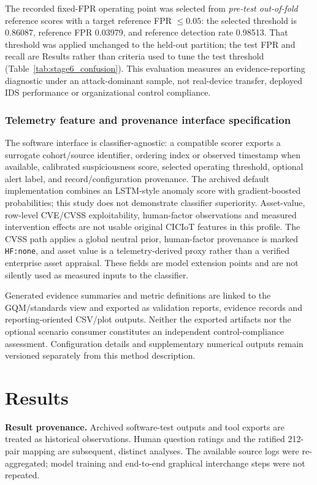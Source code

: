 \documentclass[12pt,a4paper]{article}
\begin{document}
The recorded fixed-FPR operating point was selected from \emph{pre-test out-of-fold} reference scores with a target reference FPR $\leq0.05$: the selected threshold is 0.86087, reference FPR 0.03979, and reference detection rate 0.98513. That threshold was applied unchanged to the held-out partition; the test FPR and recall are Results rather than criteria used to tune the test threshold (Table~\ref{tab:stage6_confusion}). This evaluation measures an evidence-reporting diagnostic under an attack-dominant sample, not real-device transfer, deployed IDS performance or organizational control compliance.

\subsubsection{Telemetry feature and provenance interface specification}
\label{sec:dataset}
\label{sec:model-details}
The software interface is classifier-agnostic: a compatible scorer exports a surrogate cohort/source identifier, ordering index or observed timestamp when available, calibrated suspiciousness score, selected operating threshold, optional alert label, and record/configuration provenance. The archived default implementation combines an LSTM-style anomaly score with gradient-boosted probabilities; this study does not demonstrate classifier superiority. Asset-value, row-level CVE/CVSS exploitability, human-factor observations and measured intervention effects are not usable original CICIoT features in this profile. The CVSS path applies a global neutral prior, human-factor provenance is marked \texttt{HF:none}, and asset value is a telemetry-derived proxy rather than a verified enterprise asset appraisal. These fields are model extension points and are not silently used as measured inputs to the classifier.

Generated evidence summaries and metric definitions are linked to the GQM/standards view and exported as validation reports, evidence records and reporting-oriented CSV/plot outputs. Neither the exported artifacts nor the optional scenario consumer constitutes an independent control-compliance assessment. Configuration details and supplementary numerical outputs remain versioned separately from this method description.

\section{Results}\label{sec:results}
\noindent\textbf{Result provenance.} Archived software-test outputs and tool exports are treated as historical observations. Human question ratings and the ratified 212-pair mapping are subsequent, distinct analyses. The available source logs were re-aggregated; model training and end-to-end graphical interchange steps were not repeated.
\end{document}
